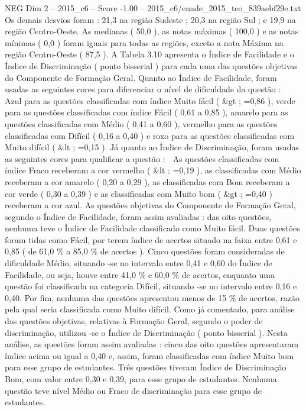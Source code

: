 \begin{textsample}{NEG Dim 2 – 2015\_c6 – Score -1.00 – 2015\_c6/enade\_2015\_teo\_839aebf29e.txt}
Os demais desvios foram : 21,3 na região Sudeste ; 20,3 na região Sul ; e 19,9 na região Centro-Oeste.
As medianas ( 50,0 ), as notas máximas ( 100,0 ) e as notas mínimas ( 0,0 ) foram iguais para todas as regiões, exceto a nota Máxima na região Centro-Oeste ( 87,5 ).
A Tabela 3.10 apresenta o Índice de Facilidade e o Índice de Discriminação ( ponto bisserial ) para cada uma das questões objetivas do Componente de Formação Geral.
Quanto ao Índice de Facilidade, foram usadas as seguintes cores para diferenciar o nível de dificuldade da questão :  Azul para as questões classificadas com índice Muito fácil ( \&gt ; =0,86 ), verde para as questões classificadas com índice Fácil ( 0,61 a 0,85 ), amarelo para as questões classificadas com Médio ( 0,41 a 0,60 ), vermelho para as questões classificadas com Difícil ( 0,16 a 0,40 ) e roxo para as questões classificadas com Muito difícil ( \&lt ; =0,15 ).
Já quanto ao Índice de Discriminação, foram usadas as seguintes cores para qualificar a questão :  As questões classificadas com índice Fraco receberam a cor vermelho ( \&lt ; =0,19 ), as classificadas com Médio receberam a cor amarelo ( 0,20 a 0,29 ), as classificadas com Bom receberam a cor verde ( 0,30 a 0,39 ) e as classificadas com Muito bom ( \&gt ; =0,40 ) receberam a cor azul.
As questões objetivas do Componente de Formação Geral, segundo o Índice de Facilidade, foram assim avaliadas : das oito questões, nenhuma teve o Índice de Facilidade classificado como Muito fácil.
Duas questões foram tidas como Fácil, por terem índice de acertos situado na faixa entre 0,61 e 0,85 ( de 61,0 \% a 85,0 \% de acertos ).
Cinco questões foram consideradas de dificuldade Médio, situando -se no intervalo entre 0,41 e 0,60 do Índice de Facilidade, ou seja, houve entre 41,0 \% e 60,0 \% de acertos, enquanto uma questão foi classificada na categoria Difícil, situando -se no intervalo entre 0,16 e 0,40.
Por fim, nenhuma das questões apresentou menos de 15 \% de acertos, razão pela qual seria classificada como Muito difícil.
Como já comentado, para análise das questões objetivas, relativas à Formação Geral, segundo o poder de discriminação, utilizou -se o Índice de Discriminação ( ponto bisserial ).
Nesta análise, as questões foram assim avaliadas : cinco das oito questões apresentaram índice acima ou igual a 0,40 e, assim, foram classificadas com índice Muito bom para esse grupo de estudantes.
Três questões tiveram Índice de Discriminação Bom, com valor entre 0,30 e 0,39, para esse grupo de estudantes.
Nenhuma questão teve nível Médio ou Fraco de discriminação para esse grupo de estudantes.

\end{textsample}
